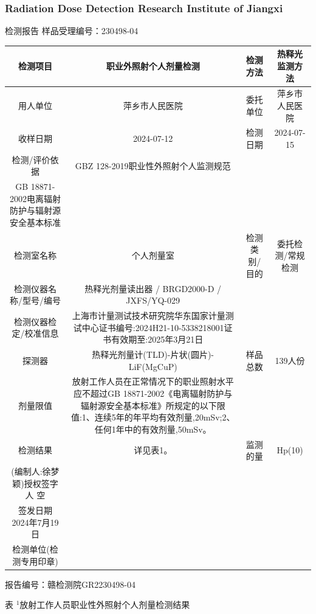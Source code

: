 \subsubsection{Radiation Dose Detection Research Institute of Jiangxi}

检测报告
样品受理编号：230498-04

\begin{table}[H]
\centering
\begin{tabular}{|c|c|c|c|}
\hline
检测项目 & 职业外照射个人剂量检测 & 检测方法 & 热释光监测方法 \\
\hline
用人单位 & 萍乡市人民医院 & 委托单位 & 萍乡市人民医院 \\
\hline
收样日期 & 2024-07-12 & 检测日期 & 2024-07-15 \\
\hline
检测/评价依据 & GBZ 128-2019职业性外照射个人监测规范 &  &  \\
\hline
GB 18871-2002电离辐射防护与辐射源安全基本标准 &  &  &  \\
\hline
检测室名称 & 个人剂量室 & 检测类别/目的 & 委托检测/常规检测 \\
\hline
检测仪器名称/型号/编号 & 热释光剂量读出器 / BRGD2000-D / JXFS/YQ-029 &  &  \\
\hline
检测仪器检定/校准信息 & 上海市计量测试技术研究院华东国家计量测试中心证书编号:2024H21-10-5338218001证书有效期至:2025年3月21日 &  &  \\
\hline
探测器 & 热释光剂量计(TLD)-片状(圆片)-LiF(MgCuP) & 样品总数 & 139人份 \\
\hline
剂量限值 & 放射工作人员在正常情况下的职业照射水平应不超过GB 18871-2002《电离辐射防护与辐射源安全基本标准》所规定的以下限值:1、连续5年的年平均有效剂量,20mSv;2、任何1年中的有效剂量,50mSv。 &  &  \\
\hline
检测结果 & 详见表1。 & 监测的量 & Hp(10) \\
\hline
(编制人:徐梦颖)授权签字人 空 &  &  &  \\
\hline
签发日期 2024年7月19日 &  &  &  \\
\hline
检测单位(检测专用印章) &  &  &  \\
\hline
\end{tabular}
\end{table}


报告编号：赣检测院GR2230498-04

表 $^ 1$放射工作人员职业性外照射个人剂量检测结果

